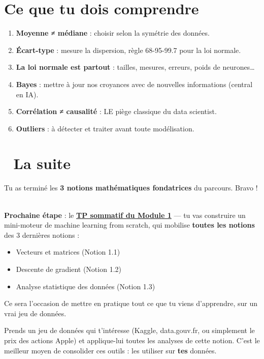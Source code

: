 \documentclass[
  french,
  11pt,
  a4paper,
]{scrbook}
\providecommand{\tightlist}{%
  \setlength{\itemsep}{0pt}\setlength{\parskip}{0pt}}
\begin{document}
\section{Ce que tu dois comprendre}\label{ce-que-tu-dois-comprendre-2}

\begin{enumerate}
\def\labelenumi{\arabic{enumi}.}
\tightlist
\item
  \textbf{Moyenne ≠ médiane} : choisir selon la symétrie des données.
\item
  \textbf{Écart-type} : mesure la dispersion, règle 68-95-99.7 pour la
  loi normale.
\item
  \textbf{La loi normale est partout} : tailles, mesures, erreurs, poids
  de neurones\ldots{}
\item
  \textbf{Bayes} : mettre à jour nos croyances avec de nouvelles
  informations (central en IA).
\item
  \textbf{Corrélation ≠ causalité} : LE piège classique du data
  scientist.
\item
  \textbf{Outliers} : à détecter et traiter avant toute modélisation.
\end{enumerate}

\section{🚀 La suite}\label{la-suite-2}

Tu as terminé les \textbf{3 notions mathématiques fondatrices} du
parcours. Bravo ! 🎉

\textbf{Prochaine étape} : le \hyperref[]{\textbf{TP sommatif du Module
1}} --- tu vas construire un mini-moteur de machine learning from
scratch, qui mobilise \textbf{toutes les notions} des 3 dernières
notions :

\begin{itemize}
\tightlist
\item
  Vecteurs et matrices (Notion 1.1)
\item
  Descente de gradient (Notion 1.2)
\item
  Analyse statistique des données (Notion 1.3)
\end{itemize}

Ce sera l'occasion de mettre en pratique tout ce que tu viens
d'apprendre, sur un vrai jeu de données.

\begin{tcolorbox}[enhanced jigsaw, arc=.35mm, bottomrule=.15mm, bottomtitle=1mm, breakable, colback=white, colbacktitle=quarto-callout-tip-color!10!white, colframe=quarto-callout-tip-color-frame, coltitle=black, left=2mm, leftrule=.75mm, opacityback=0, opacitybacktitle=0.6, rightrule=.15mm, title=\textcolor{quarto-callout-tip-color}{\faLightbulb}\hspace{0.5em}{💡 Petit défi pour la route}, titlerule=0mm, toprule=.15mm, toptitle=1mm]

Prends un jeu de données qui t'intéresse (Kaggle, data.gouv.fr, ou
simplement le prix des actions Apple) et applique-lui toutes les
analyses de cette notion. C'est le meilleur moyen de consolider ces
outils : les utiliser sur \textbf{tes} données.

\end{tcolorbox}
\end{document}
